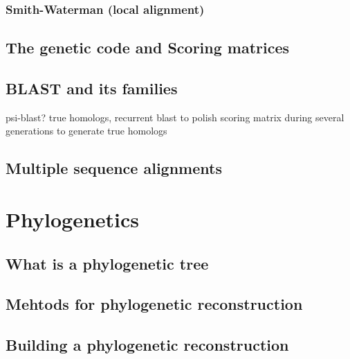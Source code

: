 \documentclass[
  letterpaper,
  DIV=11,
  numbers=noendperiod,
  oneside]{scrreprt}
\begin{document}
\hypertarget{smith-waterman-local-alignment}{%
\subsection{Smith-Waterman (local
alignment)}\label{smith-waterman-local-alignment}}

\hypertarget{the-genetic-code-and-scoring-matrices}{%
\section{The genetic code and Scoring
matrices}\label{the-genetic-code-and-scoring-matrices}}

\hypertarget{blast-and-its-families}{%
\section{BLAST and its families}\label{blast-and-its-families}}

psi-blast? true homologs, recurrent blast to polish scoring matrix
during several generations to generate true homologs

\hypertarget{multiple-sequence-alignments}{%
\section{Multiple sequence
alignments}\label{multiple-sequence-alignments}}

\hypertarget{sec-phylogenetics}{%
\chapter{Phylogenetics}\label{sec-phylogenetics}}

\hypertarget{what-is-a-phylogenetic-tree}{%
\section{What is a phylogenetic
tree}\label{what-is-a-phylogenetic-tree}}

\hypertarget{mehtods-for-phylogenetic-reconstruction}{%
\section{Mehtods for phylogenetic
reconstruction}\label{mehtods-for-phylogenetic-reconstruction}}

\hypertarget{building-a-phylogenetic-reconstruction}{%
\section{Building a phylogenetic
reconstruction}\label{building-a-phylogenetic-reconstruction}}
\end{document}
